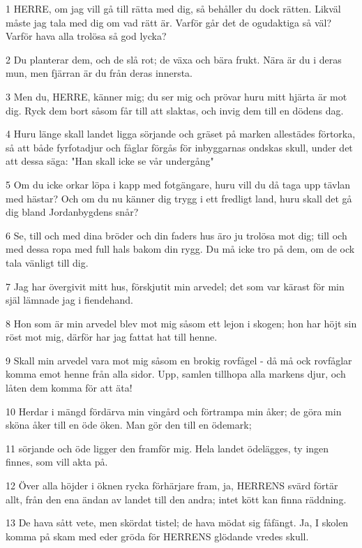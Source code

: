 \par 1 HERRE, om jag vill gå till rätta med dig, så behåller du dock rätten. Likväl måste jag tala med dig om vad rätt är. Varför går det de ogudaktiga så väl? Varför hava alla trolösa så god lycka?
\par 2 Du planterar dem, och de slå rot; de växa och bära frukt. Nära är du i deras mun, men fjärran är du från deras innersta.
\par 3 Men du, HERRE, känner mig; du ser mig och prövar huru mitt hjärta är mot dig. Ryck dem bort såsom får till att slaktas, och invig dem till en dödens dag.
\par 4 Huru länge skall landet ligga sörjande och gräset på marken allestädes förtorka, så att både fyrfotadjur och fåglar förgås för inbyggarnas ondskas skull, under det att dessa säga: "Han skall icke se vår undergång"
\par 5 Om du icke orkar löpa i kapp med fotgängare, huru vill du då taga upp tävlan med hästar? Och om du nu känner dig trygg i ett fredligt land, huru skall det gå dig bland Jordanbygdens snår?
\par 6 Se, till och med dina bröder och din faders hus äro ju trolösa mot dig; till och med dessa ropa med full hals bakom din rygg. Du må icke tro på dem, om de ock tala vänligt till dig.
\par 7 Jag har övergivit mitt hus, förskjutit min arvedel; det som var kärast för min själ lämnade jag i fiendehand.
\par 8 Hon som är min arvedel blev mot mig såsom ett lejon i skogen; hon har höjt sin röst mot mig, därför har jag fattat hat till henne.
\par 9 Skall min arvedel vara mot mig såsom en brokig rovfågel - då må ock rovfåglar komma emot henne från alla sidor. Upp, samlen tillhopa alla markens djur, och låten dem komma för att äta!
\par 10 Herdar i mängd fördärva min vingård och förtrampa min åker; de göra min sköna åker till en öde öken. Man gör den till en ödemark;
\par 11 sörjande och öde ligger den framför mig. Hela landet ödelägges, ty ingen finnes, som vill akta på.
\par 12 Över alla höjder i öknen rycka förhärjare fram, ja, HERRENS svärd förtär allt, från den ena ändan av landet till den andra; intet kött kan finna räddning.
\par 13 De hava sått vete, men skördat tistel; de hava mödat sig fåfängt. Ja, I skolen komma på skam med eder gröda för HERRENS glödande vredes skull.
